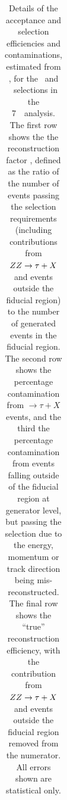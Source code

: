 \begin{table}[htbp]
\begin{tabular}{p{3.5cm}llll}
	\hline\hline
    \end{tabular}
    \caption[Details of the acceptance and selection
    efficiencies and contaminations, estimated from \mc, for the \ZZ\ and \ZZs\
    selections in the 7~\tev\ analysis.]{Details of the acceptance and selection
    efficiencies and contaminations, estimated from \mc, for the \ZZ\ and \ZZs\
    selections in the 7~\tev\ analysis. The first row shows the the
    reconstruction factor \CZZ, defined as the ratio of the number of events
    passing the selection requirements (including contributions from $ZZ
    \rightarrow \tau+X$ and events outside the fiducial region) to the number
    of generated events in the fiducial region.  The second row shows the
    percentage contamination from $\rightarrow \tau+X$ events, and the third
    the percentage contamination from events falling outside of the fiducial
    region at generator level, but passing the selection due to the energy,
    momentum or track direction being mis-reconstructed.  The final row shows
    the ``true'' reconstruction efficiency, with the contribution from $ZZ
    \rightarrow \tau+X$ and events outside the fiducial region removed from the
    numerator.  All errors shown are statistical only.}
    \label{table:objSel-czz-seven}
\end{table}

